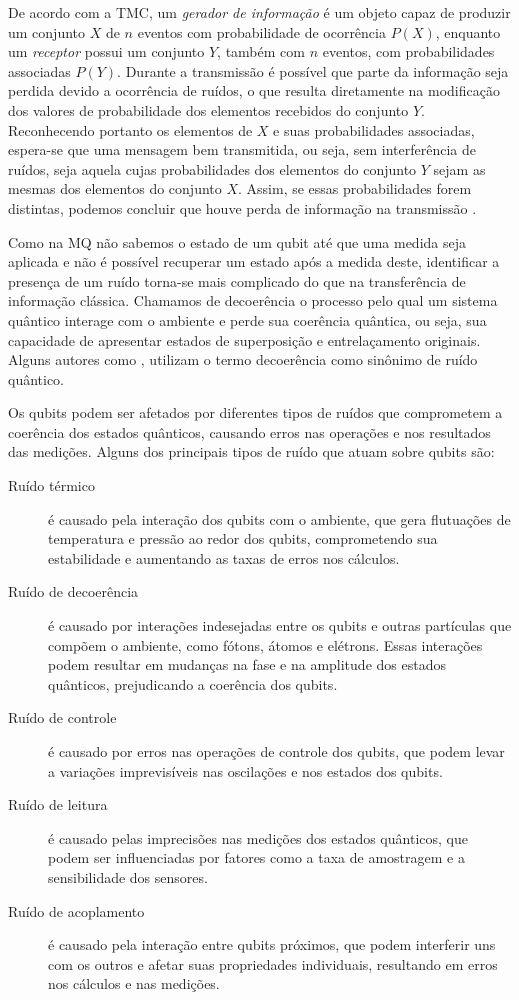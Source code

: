 De acordo com  a TMC, um \textit{gerador de informação} é um objeto capaz de produzir um conjunto $X$ de $n$ eventos com probabilidade de ocorrência $P(X)$, enquanto um \textit{receptor} possui um conjunto $Y$, também com $n$ eventos, com probabilidades associadas $P(Y)$. Durante a transmissão é possível que parte da informação seja perdida devido a ocorrência de ruídos, o que resulta diretamente na modificação dos valores de probabilidade dos elementos recebidos do conjunto $Y$. Reconhecendo portanto os elementos de $X$ e suas probabilidades associadas, espera-se que uma mensagem bem transmitida, ou seja, sem interferência de ruídos, seja aquela cujas probabilidades dos elementos do conjunto $Y$ sejam as mesmas dos elementos do conjunto $X$. Assim, se essas probabilidades forem distintas, podemos concluir que houve perda de informação na transmissão \cite{mathematical}.

Como na MQ não sabemos o estado de um qubit até que uma medida seja aplicada e não é possível recuperar um estado após a medida deste, identificar a presença de um ruído torna-se mais complicado do que na transferência de informação clássica. Chamamos de decoerência o processo pelo qual um sistema quântico interage com o ambiente e perde sua coerência quântica, ou seja, sua capacidade de apresentar estados de superposição e entrelaçamento originais. Alguns autores como \textcite{chuang}, utilizam o termo decoerência como sinônimo de ruído quântico.

Os qubits podem ser afetados por diferentes tipos de ruídos que comprometem a coerência dos estados quânticos, causando erros nas operações e nos resultados das medições. Alguns dos principais tipos de ruído que atuam sobre qubits são:
\begin{description}
\item [Ruído térmico] é causado pela interação dos qubits com o ambiente, que gera flutuações de temperatura e pressão ao redor dos qubits, comprometendo sua estabilidade e aumentando as taxas de erros nos cálculos.
\item [Ruído de decoerência] é causado por interações indesejadas entre os qubits e outras partículas que compõem o ambiente, como fótons, átomos e elétrons. Essas interações podem resultar em mudanças na fase e na amplitude dos estados quânticos, prejudicando a coerência dos qubits.
\item [Ruído de controle] é causado por erros nas operações de controle dos qubits, que podem levar a variações imprevisíveis nas oscilações e nos estados dos qubits.
\item [Ruído de leitura] é causado pelas imprecisões nas medições dos estados quânticos, que podem ser influenciadas por fatores como a taxa de amostragem e a sensibilidade dos sensores.
\item [Ruído de acoplamento] é causado pela interação entre qubits próximos, que podem interferir uns com os outros e afetar suas propriedades individuais, resultando em erros nos cálculos e nas medições.
\end{description}

